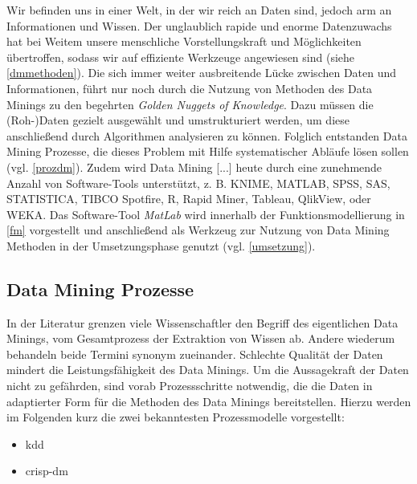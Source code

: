 \glqq Wir befinden uns in einer Welt, in der wir reich an Daten sind, jedoch arm an Informationen und Wissen.\grqq{} Der unglaublich rapide und enorme Datenzuwachs hat bei Weitem unsere menschliche Vorstellungskraft und Möglichkeiten übertroffen, sodass wir auf effiziente Werkzeuge angewiesen sind (siehe \vref{dmmethoden}). Die sich immer weiter ausbreitende Lücke zwischen Daten und Informationen, führt nur noch durch die Nutzung von Methoden des Data Minings zu den begehrten \glqq \textit{Golden Nuggets of Knowledge}\grqq. Dazu müssen die (Roh-)Daten gezielt ausgewählt und umstrukturiert werden, um diese anschließend durch Algorithmen analysieren zu können. Folglich entstanden Data Mining Prozesse, die dieses Problem mit Hilfe systematischer Abläufe lösen sollen (vgl. \vref{prozdm}). Zudem wird \glqq Data Mining [...] heute durch eine zunehmende Anzahl von Software-Tools unterstützt, z. B. KNIME, MATLAB, SPSS, SAS, STATISTICA, TIBCO Spotfire, R, Rapid Miner, Tableau, QlikView, oder WEKA.\grqq{} Das Software-Tool \textit{MatLab} wird innerhalb der Funktionsmodellierung in \vref{fm} vorgestellt und anschließend als Werkzeug zur Nutzung von Data Mining Methoden in der Umsetzungsphase genutzt (vgl. \vref{umsetzung}).


\subsection{Data Mining Prozesse}
\label{prozdm}

In der Literatur grenzen viele Wissenschaftler den Begriff des eigentlichen Data Minings, vom Gesamtprozess der Extraktion von Wissen ab. Andere wiederum behandeln beide Termini synonym zueinander. Schlechte Qualität der Daten mindert die Leistungsfähigkeit des Data Minings. Um die Aussagekraft der Daten nicht zu gefährden, sind vorab Prozessschritte notwendig, die die Daten in adaptierter Form für die Methoden des Data Minings bereitstellen. Hierzu werden im Folgenden kurz die zwei bekanntesten Prozessmodelle vorgestellt:

\begin{itemize}
\item \gls{kdd}
\item \gls{crisp-dm}
\end{itemize}

